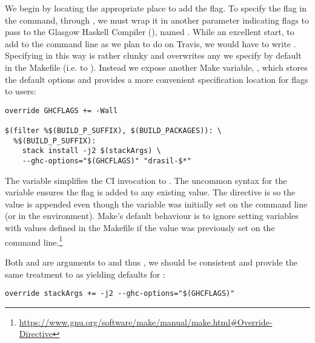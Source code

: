 {{We begin by locating the appropriate place to add the  flag. To specify the flag in the  command, through , we must wrap it in another parameter indicating flags to pass to the Glasgow Haskell Compiler (), named . While an excellent start, to add \linebreak{} to the command line as we plan to do on Travis, we would have to write . Specifying  in this way is rather clunky and overwrites any  we specify by default in the Makefile (i.e.  to ). Instead we expose another Make variable, , which stores the default options and provides a more convenient specification location for  flags to users:

\begin{tcolorbox}
\begin{verbatim}
override GHCFLAGS += -Wall

$(filter %$(BUILD_P_SUFFIX), $(BUILD_PACKAGES)): \ 
  %$(BUILD_P_SUFFIX):
	stack install -j2 $(stackArgs) \
	--ghc-options="$(GHCFLAGS)" "drasil-$*"
\end{verbatim}
\end{tcolorbox}

The  variable simplifies the CI invocation to \linebreak{}. The uncommon syntax for the  variable ensures the  flag is added to any existing  value. The  directive is so the  value is appended even though the variable was initially set on the command line (or in the environment). Make's default behaviour is to ignore setting variables with values defined in the Makefile if the value was previously set on the command line.\footnote{\url{https://www.gnu.org/software/make/manual/make.html\#Override-Directive}} 

Both  and  are arguments to  and thus , we should be consistent and provide the same treatment to  as  yielding defaults for :

\begin{tcolorbox}
\begin{verbatim}
override stackArgs += -j2 --ghc-options="$(GHCFLAGS)"
\end{verbatim}
\end{tcolorbox}

}}
